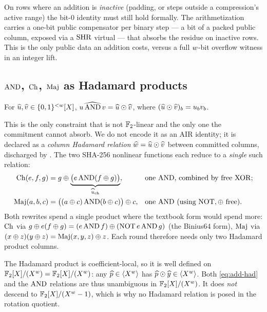 \begin{remark}
\label{rem:lsb-comp}
On rows where an addition is \emph{inactive} (padding, or steps outside a
compression's active range) the bit-$0$ identity must still hold formally. The
arithmetization carries a one-bit public compensator per binary step --- a bit
of a packed public column, exposed via a $\operatorname{SHR}$ virtual --- that absorbs the
residue on inactive rows. This is the only public data an addition costs,
versus a full $w$-bit overflow witness in an integer lift.
\end{remark}

\subsection{$\operatorname{AND}$, $\operatorname{Ch}$, $\operatorname{Maj}$ as Hadamard products}
\label{sec:and}

\begin{lemma}
\label{lem:and}
For $\widehat{u},\widehat{v}\in\{0,1\}^{<w}[X]$, $\widehat{u\operatorname{AND} v} = \widehat{u}\odot\widehat{v}$,
where $(\widehat{u}\odot\widehat{v})_b = u_b v_b$.
\end{lemma}

This is the only constraint that is not $\mathbb{F}_2$-linear and the only one the
commitment cannot absorb. We do not encode it as an AIR identity; it is declared
as a \emph{column Hadamard relation} $\widehat{w} = \widehat{u}\odot\widehat{v}$ between
committed columns, discharged by . The two SHA-256 nonlinear
functions each reduce to a \emph{single} such relation:
\begin{align*}
  \operatorname{Ch}(e,f,g) &= g \oplus \underbrace{\bigl(e\operatorname{AND}(f\oplus g)\bigr)}_{\widehat{u}_{\mathrm{ch}}},
  & &\text{one $\operatorname{AND}$, combined by free $\operatorname{XOR}$;}\\
  \operatorname{Maj}(a,b,c) &= \bigl((a\oplus c)\operatorname{AND}(b\oplus c)\bigr)\oplus c,
  & &\text{one $\operatorname{AND}$ (using $\operatorname{NOT},\oplus$ free).}
\end{align*}
Both rewrites spend a single product where the textbook form would spend more:
$\operatorname{Ch}$ via $g\oplus e(f\oplus g) = (e\operatorname{AND} f)\oplus(\operatorname{NOT} e\operatorname{AND} g)$ (the Binius64
form), $\operatorname{Maj}$ via $(x\oplus z)(y\oplus z) = \operatorname{Maj}(x,y,z)\oplus z$. Each round
therefore needs only two Hadamard product columns.

\begin{remark}
\label{rem:had-descend}
The Hadamard product is coefficient-local, so it is well defined on
$\mathbb{F}_2[X]/(X^{w}) = \mathbb{F}_2[X]/(X^{w})$: any $\widehat{p}\in\langle X^{w} \rangle$ has
$\widehat{p}\odot\widehat{y}\in\langle X^{w} \rangle$. Both \eqref{eq:add-had} and the $\operatorname{AND}$
relations are thus unambiguous in $\mathbb{F}_2[X]/(X^{w})$. It does \emph{not} descend to
$\mathbb{F}_2[X]/(X^{w}-1)$, which is why no Hadamard relation is posed in the rotation quotient.
\end{remark}

